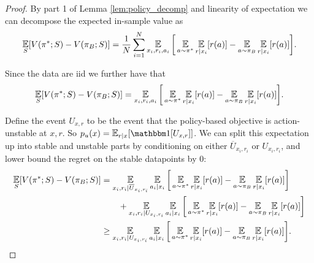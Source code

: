 \begin{proof}
By part 1 of Lemma \ref{lem:policy_decomp} and linearity of expectation we can decompose the expected in-sample value as
\begin{align*}
    \E_{S}[V(\pi^*;S) - V(\pi_B;S)] = \frac{1}{N}\sum_{i=1}^N \E_{x_i, r_i, a_i}\bigg[ \E_{a\sim \pi^*}\E_{r|x_i}[r(a)] -  \E_{a\sim \pi_B}\E_{r|x_i}[r(a)]\bigg].
\end{align*}

Since the data are iid we further have that
\begin{align*}
    \E_{S}[V(\pi^*;S) - V(\pi_B;S)] = \E_{x_i, r_i, a_i}\bigg[ \E_{a\sim \pi^*}\E_{r|x_i}[r(a)] -  \E_{a\sim \pi_B}\E_{r|x_i}[r(a)]\bigg].
\end{align*}

Define the event $ U_{x,r}$ to be the event that the policy-based objective is action-unstable at $ x,r$. So $ p_u(x) = \E_{r|x}[\one[U_{x,r}]]$.
We can split this expectation up into stable and unstable parts by conditioning on either $ \overline U_{x_i, r_i}$ or $ U_{x_i, r_i}$, and lower bound the regret on the stable datapoints by 0:
\begin{align*}
    \E_{S}[V(\pi^*;S) - V(\pi_B;S)] &= \E_{x_i, r_i |\overline U_{x_i, r_i}} \E_{a_i|x_i}\bigg[ \E_{a\sim \pi^*}\E_{r|x_i}[r(a)] -  \E_{a\sim \pi_B}\E_{r|x_i}[r(a)]\bigg] \\
    &\qquad + \E_{x_i, r_i |U_{x_i, r_i}} \E_{ a_i|x_i}\bigg[ \E_{a\sim \pi^*}\E_{r|x_i}[r(a)] -  \E_{a\sim \pi_B}\E_{r|x_i}[r(a)]\bigg]\\
    &\geq \E_{x_i, r_i |U_{x_i, r_i}} \E_{ a_i|x_i}\bigg[ \E_{a\sim \pi^*}\E_{r|x_i}[r(a)] -  \E_{a\sim \pi_B}\E_{r|x_i}[r(a)]\bigg].
\end{align*}


\end{proof}
